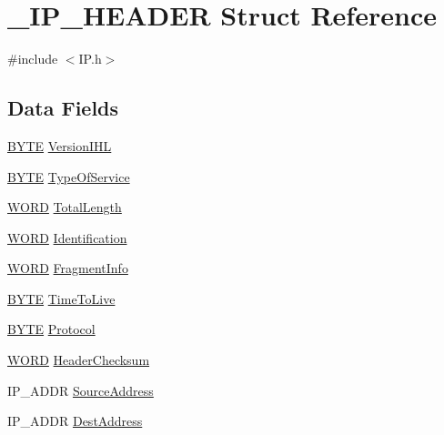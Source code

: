 \hypertarget{struct___i_p___h_e_a_d_e_r}{}\section{\+\_\+\+I\+P\+\_\+\+H\+E\+A\+D\+E\+R Struct Reference}
\label{struct___i_p___h_e_a_d_e_r}


{\ttfamily \#include $<$I\+P.\+h$>$}

\subsection*{Data Fields}
\begin{DoxyCompactItemize}
\item 
\hyperlink{_generic_type_defs_8h_a4ae1dab0fb4b072a66584546209e7d58}{B\+Y\+T\+E} \hyperlink{struct___i_p___h_e_a_d_e_r_a87dcae13270bf37a7286d034ae486e01}{Version\+I\+H\+L}
\item 
\hyperlink{_generic_type_defs_8h_a4ae1dab0fb4b072a66584546209e7d58}{B\+Y\+T\+E} \hyperlink{struct___i_p___h_e_a_d_e_r_a9106cd83a2edc9722948cc0adf39778e}{Type\+Of\+Service}
\item 
\hyperlink{_generic_type_defs_8h_a2b0e863dadf920709ec53d9088ee7c91}{W\+O\+R\+D} \hyperlink{struct___i_p___h_e_a_d_e_r_a0869535fb048abe001be1e8b139976f6}{Total\+Length}
\item 
\hyperlink{_generic_type_defs_8h_a2b0e863dadf920709ec53d9088ee7c91}{W\+O\+R\+D} \hyperlink{struct___i_p___h_e_a_d_e_r_a2ebcde38c9ed0b3c858e0251743a29d5}{Identification}
\item 
\hyperlink{_generic_type_defs_8h_a2b0e863dadf920709ec53d9088ee7c91}{W\+O\+R\+D} \hyperlink{struct___i_p___h_e_a_d_e_r_a40563683dc3368bf18af8113d4b0e027}{Fragment\+Info}
\item 
\hyperlink{_generic_type_defs_8h_a4ae1dab0fb4b072a66584546209e7d58}{B\+Y\+T\+E} \hyperlink{struct___i_p___h_e_a_d_e_r_a60bdd9d9c701296edda45f0519aa4afb}{Time\+To\+Live}
\item 
\hyperlink{_generic_type_defs_8h_a4ae1dab0fb4b072a66584546209e7d58}{B\+Y\+T\+E} \hyperlink{struct___i_p___h_e_a_d_e_r_a4e3381dd4fcd372f6f4fb0b2577e541a}{Protocol}
\item 
\hyperlink{_generic_type_defs_8h_a2b0e863dadf920709ec53d9088ee7c91}{W\+O\+R\+D} \hyperlink{struct___i_p___h_e_a_d_e_r_ae813081f1a360c41b97d41320089eaeb}{Header\+Checksum}
\item 
I\+P\+\_\+\+A\+D\+D\+R \hyperlink{struct___i_p___h_e_a_d_e_r_a89fa95e930f178cad3eae53104b93622}{Source\+Address}
\item 
I\+P\+\_\+\+A\+D\+D\+R \hyperlink{struct___i_p___h_e_a_d_e_r_a3116a419f3c363294726255181ca77c7}{Dest\+Address}
\end{DoxyCompactItemize}


